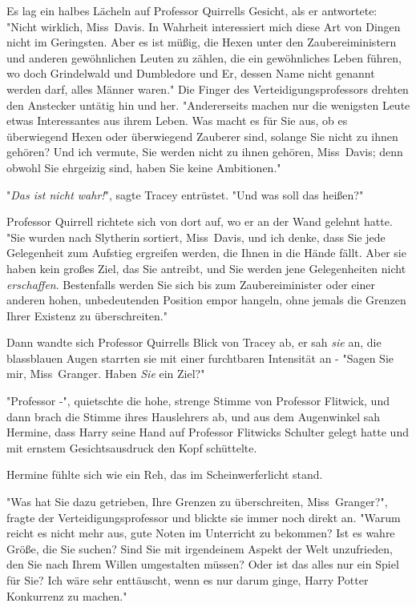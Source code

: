 {Es lag ein halbes Lächeln auf Professor Quirrells Gesicht, als er antwortete: "Nicht wirklich, Miss~Davis. In Wahrheit interessiert mich diese Art von Dingen nicht im Geringsten. Aber es ist müßig, die Hexen unter den Zaubereiministern und anderen gewöhnlichen Leuten zu zählen, die ein gewöhnliches Leben führen, wo doch Grindelwald und Dumbledore und Er, dessen Name nicht genannt werden darf, alles Männer waren." Die Finger des Verteidigungsprofessors drehten den Anstecker untätig hin und her. "Andererseits machen nur die wenigsten Leute etwas Interessantes aus ihrem Leben. Was macht es für Sie aus, ob es überwiegend Hexen oder überwiegend Zauberer sind, solange Sie nicht zu ihnen gehören? Und ich vermute, Sie werden nicht zu ihnen gehören, Miss~Davis; denn obwohl Sie ehrgeizig sind, haben Sie keine Ambitionen."

"\emph{Das ist nicht wahr!}", sagte Tracey entrüstet. "Und was soll das heißen?"

Professor Quirrell richtete sich von dort auf, wo er an der Wand gelehnt hatte. "Sie wurden nach Slytherin sortiert, Miss~Davis, und ich denke, dass Sie jede Gelegenheit zum Aufstieg ergreifen werden, die Ihnen in die Hände fällt. Aber sie haben kein großes Ziel, das Sie antreibt, und Sie werden jene Gelegenheiten nicht \emph{erschaffen}. Bestenfalls werden Sie sich bis zum Zaubereiminister oder einer anderen hohen, unbedeutenden Position empor hangeln, ohne jemals die Grenzen Ihrer Existenz zu überschreiten."

Dann wandte sich Professor Quirrells Blick von Tracey ab, er sah \emph{sie} an, die blassblauen Augen starrten sie mit einer furchtbaren Intensität an - "Sagen Sie mir, Miss~Granger. Haben \emph{Sie} ein Ziel?"

"Professor -", quietschte die hohe, strenge Stimme von Professor Flitwick, und dann brach die Stimme ihres Hauslehrers ab, und aus dem Augenwinkel sah Hermine, dass Harry seine Hand auf Professor Flitwicks Schulter gelegt hatte und mit ernstem Gesichtsausdruck den Kopf schüttelte.

Hermine fühlte sich wie ein Reh, das im Scheinwerferlicht stand.

"Was hat Sie dazu getrieben, Ihre Grenzen zu überschreiten, Miss~Granger?", fragte der Verteidigungsprofessor und blickte sie immer noch direkt an. "Warum reicht es nicht mehr aus, gute Noten im Unterricht zu bekommen? Ist es wahre Größe, die Sie suchen? Sind Sie mit irgendeinem Aspekt der Welt unzufrieden, den Sie nach Ihrem Willen umgestalten müssen? Oder ist das alles nur ein Spiel für Sie? Ich wäre sehr enttäuscht, wenn es nur darum ginge, Harry Potter Konkurrenz zu machen."

}
